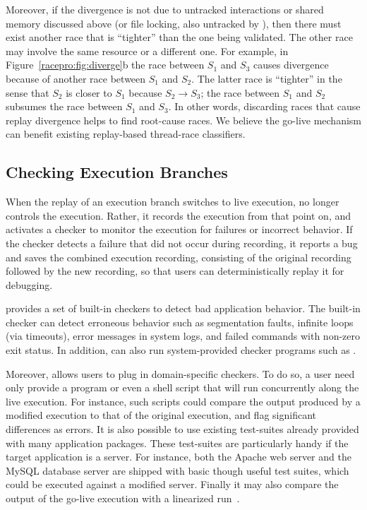 Moreover, if the divergence is not due to untracked interactions or
shared memory discussed above (or file locking, also untracked by
\racepro), then there must exist another race that is ``tighter'' than the
one being validated. The other race may involve the same resource or a
different one. For example, in Figure~\ref{racepro:fig:diverge}b the race
between $S_1$ and $S_3$ causes divergence because of another race
between $S_1$ and $S_2$. The latter race is ``tighter'' in the sense
that $S_2$ is closer to $S_1$ because $S_2 \rightarrow S_3$; the race
between $S_1$ and $S_2$ subsumes the race between $S_1$ and $S_3$. In
other words, discarding races that cause replay divergence helps \racepro
to find root-cause races. We believe the go-live mechanism can benefit
existing replay-based thread-race classifiers.

\subsection{Checking Execution Branches}  \label{racepro:sec:check}

When the replay of an execution branch switches to live
execution, \racepro no longer controls the execution. Rather, it records
the execution from that point on, and activates a checker to monitor
the execution for failures or incorrect behavior. If the checker
detects a failure that did not occur during recording,
it reports a bug and saves the combined
execution recording, consisting of the original recording followed by
the new recording, so that users can deterministically replay it for
debugging.

\racepro provides a set of built-in checkers to detect bad application
behavior. The built-in checker can detect erroneous behavior such as
segmentation faults, infinite loops (via timeouts), error messages in
system logs, and failed commands with non-zero exit status. 
In addition, \racepro can also run system-provided checker
programs such as .

Moreover, \racepro allows users to plug in domain-specific checkers. To do
so, a user need only provide a program or even a shell script that
will run concurrently along the live execution. For instance, such
scripts could compare the output produced by a modified execution to that
of the original execution, and flag significant differences as errors.
It is also possible to use existing test-suites already provided
with many application packages.  These test-suites are particularly handy if
the target application is a server. For instance, both the Apache web
server and the MySQL database server are shipped with basic though
useful test suites, which could be executed against a modified server.
Finally it may also compare the output of the go-live execution with a
linearized run~\cite{linearizable:eurosys11}.

